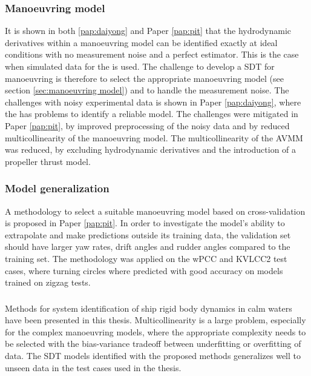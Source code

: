 \subsubsection*{Manoeuvring model}
It is shown in both \ref{pap:daiyong} and Paper \ref{pap:pit} that the hydrodynamic derivatives within a manoeuvring model can be identified exactly at ideal conditions with no measurement noise and a perfect estimator. This is the case when simulated data for the  is used.
The challenge to develop a SDT for manoeuvring is therefore to select the appropriate manoeuvring model (see section \ref{sec:manoeuvring model}) and to handle the measurement noise.
The challenges with noisy experimental data is shown in Paper \ref{pap:daiyong}, where the  has problems to identify a reliable model. The challenges were mitigated in Paper \ref{pap:pit}, by improved preprocessing of the noisy data and by reduced multicollinearity of the manoeuvring model. The multicollinearity of the AVMM was reduced, by excluding hydrodynamic derivatives and the introduction of a propeller thrust model.

\subsubsection*{Model generalization}
A methodology to select a suitable manoeuvring model based on cross-validation is proposed in Paper \ref{pap:pit}. In order to investigate the model's ability to extrapolate and make predictions outside its training data, the validation set should have larger yaw rates, drift angles and rudder angles compared to the training set. The methodology was applied on the wPCC and KVLCC2 test cases, where turning circles where predicted with good accuracy on models trained on zigzag tests. 

\subsubsection*{}
Methods for system identification of ship rigid body dynamics in calm waters have been presented in this thesis. Multicollinearity is a large problem, especially for the complex manoeuvring models, where the appropriate complexity needs to be selected with the bias-variance tradeoff between underfitting or overfitting of data. The SDT models identified with the proposed methods generalizes well to unseen data in the test cases used in the thesis.